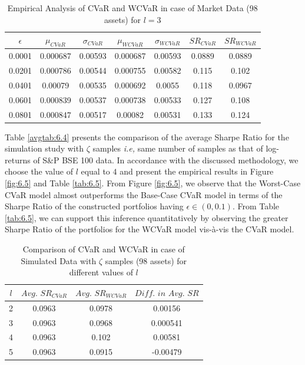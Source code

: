 \begin{table}[!h]
    \centering
    \captionsetup{justification=centering}

   \begin{tabular}{||c|c|c|c|c|c|c||}
   \hline
  
$\epsilon$ & $\mu_{CVaR}$ & $\sigma_{CVaR}$ & $\mu_{WCVaR}$ & $\sigma_{WCVaR}$ & $SR_{CVaR}$ & $SR_{WCVaR}$\\
  
  \hline
0.0001 & 0.000687 & 0.00593 & 0.000687 & 0.00593 & 0.0889 & 0.0889 \\
0.0201 & 0.000786 & 0.00544 & 0.000755 & 0.00582 & 0.115 & 0.102 \\
0.0401 & 0.00079 & 0.00535 & 0.000692 & 0.0055 & 0.118 & 0.0967 \\
0.0601 & 0.000839 & 0.00537 & 0.000738 & 0.00533 & 0.127 & 0.108 \\
0.0801 & 0.000847 & 0.00517 & 0.00082 & 0.00531 & 0.133 & 0.124 \\
  \hline
\end{tabular}
    \caption{Empirical Analysis of CVaR and WCVaR in case of Market Data (98 assets) for $l=3$}
    \label{tab:6.4}
\end{table}

Table \ref{avgtab:6.4} presents the comparison of the average Sharpe Ratio for the simulation study with $\zeta$ samples \textit{i.e,} same number of samples as that of log-returns of S\&P BSE 100 data. In accordance with the discussed methodology, we choose the value of $l$ equal to $4$ and present the empirical results in Figure \ref{fig:6.5} and Table \ref{tab:6.5}. From Figure \ref{fig:6.5}, we observe that the Worst-Case CVaR model almost outperforms the Base-Case CVaR model in terms of the Sharpe Ratio of the constructed portfolios having $\epsilon \in (0,0.1)$. From Table \ref{tab:6.5}, we can support this inference quantitatively by observing the greater Sharpe Ratio of the portfolios for the WCVaR model vis-\`a-vis the CVaR model. 

\begin{table}[!h]
    \centering
    \captionsetup{justification=centering}

   \begin{tabular}{||c|c|c|c||}
   \hline
  
$l$ & $Avg. \, \, SR_{CVaR}$ & $Avg. \, \, SR_{WCVaR}$ & $Diff. \, \, in \, \, Avg. \, \, SR$ \\
  
  \hline
2 & 0.0963 & 0.0978 & 0.00156 \\
3 & 0.0963 & 0.0968 & 0.000541 \\
4 & 0.0963 & 0.102 & 0.00581 \\
5 & 0.0963 & 0.0915 & -0.00479 \\
  \hline
\end{tabular}
    \caption{Comparison of CVaR and WCVaR in case of Simulated Data with $\zeta$ samples (98 assets) for different values of $l$}
    \label{avgtab:6.5}
\end{table}

